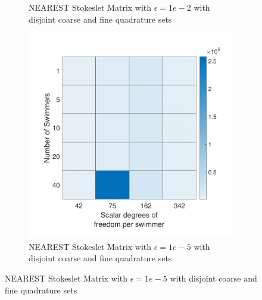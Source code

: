 \begin{figure}
\begin{subfigure}{0.3\textwidth}
        \caption{NEAREST Stokeslet Matrix with $\epsilon=1e-2$ with disjoint coarse and fine quadrature sets}
    \end{subfigure}
    \begin{subfigure}{0.3\textwidth}
        \includegraphics[width=\linewidth]{Images/Condition/Stokeslet Matrix using Disjoint NEAREST-5.pdf}
        \caption{NEAREST Stokeslet Matrix with $\epsilon=1e-5$ with disjoint coarse and fine quadrature sets}
    \end{subfigure}
\end{figure}

